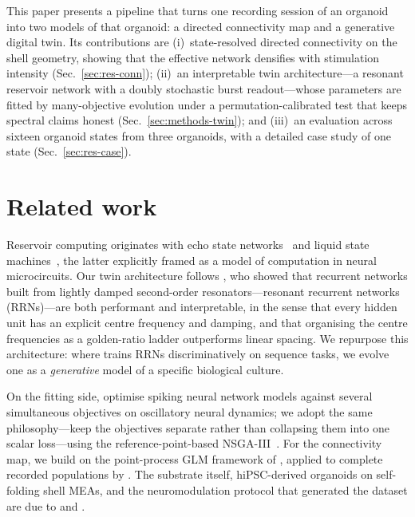 \documentclass[fullpaper]{nldl}
\begin{document}
This paper presents a pipeline that turns one recording session of an organoid into two models of that organoid: a directed connectivity map and a generative digital twin. Its contributions are (i)~state-resolved directed connectivity on the shell geometry, showing that the effective network densifies with stimulation intensity (Sec.~\ref{sec:res-conn}); (ii)~an interpretable twin architecture---a resonant reservoir network with a doubly stochastic burst readout---whose parameters are fitted by many-objective evolution under a permutation-calibrated test that keeps spectral claims honest (Sec.~\ref{sec:methods-twin}); and (iii)~an evaluation across sixteen organoid states from three organoids, with a detailed case study of one state (Sec.~\ref{sec:res-case}).

\section{Related work}
\label{sec:related}

Reservoir computing originates with echo state networks~\citep{jaeger2001echo} and liquid state machines~\citep{maass2002realtime}, the latter explicitly framed as a model of computation in neural microcircuits. Our twin architecture follows \citet{kramer2025resonant}, who showed that recurrent networks built from lightly damped second-order resonators---resonant recurrent networks (RRNs)---are both performant and interpretable, in the sense that every hidden unit has an explicit centre frequency and damping, and that organising the centre frequencies as a golden-ratio ladder outperforms linear spacing. We repurpose this architecture: where \citet{kramer2025resonant} trains RRNs discriminatively on sequence tasks, we evolve one as a \emph{generative} model of a specific biological culture.

On the fitting side, \citet{sethi2026multiobjective} optimise spiking neural network models against several simultaneous objectives on oscillatory neural dynamics; we adopt the same philosophy---keep the objectives separate rather than collapsing them into one scalar loss---using the reference-point-based NSGA-III~\citep{deb2014nsga3}. For the connectivity map, we build on the point-process GLM framework of \citet{truccolo2005point}, applied to complete recorded populations by \citet{pillow2008spatiotemporal}. The substrate itself, hiPSC-derived organoids on self-folding shell MEAs, and the neuromodulation protocol that generated the dataset are due to \citet{huang2022shell} and \citet{acha2026neuromodulation}.
\end{document}
